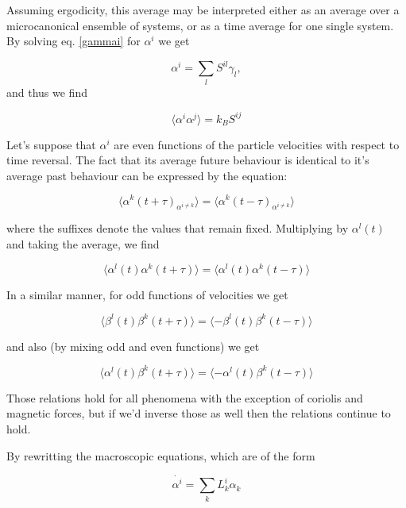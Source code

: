 \documentclass[a4paper,12pt,nofootinbib]{article}
\begin{document}
Assuming ergodicity, this average may be interpreted either as an average over a microcanonical ensemble of systems, or as a time average for one single system.
By solving eq. \ref{gammai} for $\alpha^i $ we get

\begin{equation}
  \alpha^i=\sum_l S^{il}\gamma_l,
\end{equation}
and thus we find

\begin{equation}
	\langle \alpha^i \alpha^j \rangle = k_B S^{ij}   
\end{equation}

Let's suppose that $\alpha^i$ are even functions of the particle velocities with respect to time reversal.
The fact that its average future behaviour is identical to it's average past behaviour can be expressed by the equation:

\begin{equation}
  \langle \alpha^k (t+\tau)_{\alpha^{i \neq k}} \rangle =   \langle \alpha^k(t-\tau)_{\alpha^{i \neq k}} \rangle
\end{equation}

where the suffixes denote the values that remain fixed. Multiplying by $\alpha^l(t)$ and taking the average, we find

\begin{equation}
  \langle \alpha^l(t) \alpha^k (t+\tau) \rangle = \langle \alpha^l(t) \alpha^k(t-\tau) \rangle
\end{equation}

In a similar manner, for odd functions of velocities we get

\begin{equation}
  \langle \beta^l(t) \beta^k (t+\tau) \rangle = \langle - \beta^l(t) \beta^k(t-\tau) \rangle
\end{equation}

and also (by mixing odd and even functions) we get

\begin{equation}
  \langle \alpha^l(t) \beta^k (t+\tau) \rangle = \langle - \alpha^l(t) \beta^k(t-\tau) \rangle
\end{equation}

Those relations hold for all phenomena with the exception of coriolis and magnetic forces, but if we'd inverse those as well then the relations continue to hold.

By rewritting the macroscopic equations, which are of the form

\begin{equation}
  \dot{\alpha^i}= \sum_k L_k^i \alpha_k
\end{equation}
\end{document}

